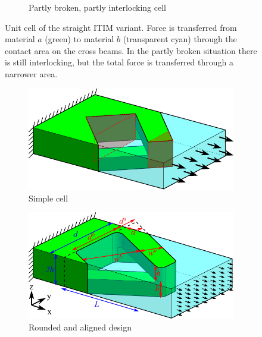 \begin{figure}
\begin{subfigure}[B]{.32\textwidth}
		\caption{Partly broken, partly interlocking cell}
		\label{interlocking:fig:straight_model_broken}
	\end{subfigure}
	\caption{Unit cell of the straight ITIM variant. Force is transferred from material $a$ (green) to material $b$ (transparent cyan) through the contact area on the cross beams. In the partly broken situation there is still interlocking, but the total force is transferred through a narrower area.}
\end{figure}

\begin{figure}
	\centering
	\begin{subfigure}[B]{.25\textwidth}
		\centering
		\includegraphics{sources-method-diagonal_model_simple_v5.pdf}
		\caption{Simple cell}
		\label{interlocking:fig:diagonal_model_simple}
	\end{subfigure}
	\begin{subfigure}[B]{.33\textwidth}
		\centering
		\includegraphics{sources-method-diagonal_model_v5_no_failures.pdf}
		\caption{Rounded and aligned design}
		\label{interlocking:fig:diagonal_model}
	\end{subfigure}
	\begin{subfigure}[B]{.33\textwidth}
		\centering

\end{subfigure}
\end{figure}
